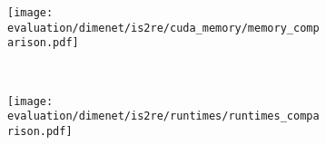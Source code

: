 \begin{figure}[H]
    \vspace*{1em}

    \begin{subfigure}[t]{0.48\textwidth}
        \centering
        \texttt{[image: evaluation/dimenet/is2re/cuda\_memory/memory\_comparison.pdf]}
        \label{fig:dimenet-is2re-memory-results}
    \end{subfigure}%
    ~
    \begin{subfigure}[t]{0.48\textwidth}
        \centering
        \texttt{[image: evaluation/dimenet/is2re/runtimes/runtimes\_comparison.pdf]}
        \label{dimenet-is2re-runtimes-results}
    \end{subfigure}

    \vspace*{-1em}


\end{figure}
